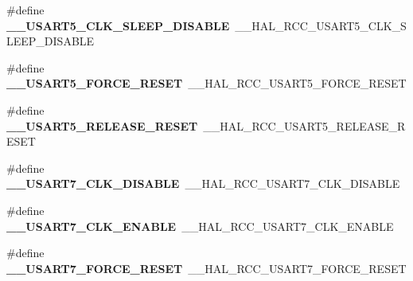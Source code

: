 \begin{DoxyCompactItemize}
\item 
\#define {\bfseries \+\_\+\+\_\+\+U\+S\+A\+R\+T5\+\_\+\+C\+L\+K\+\_\+\+S\+L\+E\+E\+P\+\_\+\+D\+I\+S\+A\+B\+LE}~\+\_\+\+\_\+\+H\+A\+L\+\_\+\+R\+C\+C\+\_\+\+U\+S\+A\+R\+T5\+\_\+\+C\+L\+K\+\_\+\+S\+L\+E\+E\+P\+\_\+\+D\+I\+S\+A\+B\+LE\hypertarget{group___h_a_l___r_c_c___aliased_ga3ebcd8aa43ec53601b15d7ddd88c7a5f}{}\label{group___h_a_l___r_c_c___aliased_ga3ebcd8aa43ec53601b15d7ddd88c7a5f}

\item 
\#define {\bfseries \+\_\+\+\_\+\+U\+S\+A\+R\+T5\+\_\+\+F\+O\+R\+C\+E\+\_\+\+R\+E\+S\+ET}~\+\_\+\+\_\+\+H\+A\+L\+\_\+\+R\+C\+C\+\_\+\+U\+S\+A\+R\+T5\+\_\+\+F\+O\+R\+C\+E\+\_\+\+R\+E\+S\+ET\hypertarget{group___h_a_l___r_c_c___aliased_gaebc2c005ab8b9526cc9d9aa8d2fbc99d}{}\label{group___h_a_l___r_c_c___aliased_gaebc2c005ab8b9526cc9d9aa8d2fbc99d}

\item 
\#define {\bfseries \+\_\+\+\_\+\+U\+S\+A\+R\+T5\+\_\+\+R\+E\+L\+E\+A\+S\+E\+\_\+\+R\+E\+S\+ET}~\+\_\+\+\_\+\+H\+A\+L\+\_\+\+R\+C\+C\+\_\+\+U\+S\+A\+R\+T5\+\_\+\+R\+E\+L\+E\+A\+S\+E\+\_\+\+R\+E\+S\+ET\hypertarget{group___h_a_l___r_c_c___aliased_gaef0270121b0ce4da2cf3f994458326ef}{}\label{group___h_a_l___r_c_c___aliased_gaef0270121b0ce4da2cf3f994458326ef}

\item 
\#define {\bfseries \+\_\+\+\_\+\+U\+S\+A\+R\+T7\+\_\+\+C\+L\+K\+\_\+\+D\+I\+S\+A\+B\+LE}~\+\_\+\+\_\+\+H\+A\+L\+\_\+\+R\+C\+C\+\_\+\+U\+S\+A\+R\+T7\+\_\+\+C\+L\+K\+\_\+\+D\+I\+S\+A\+B\+LE\hypertarget{group___h_a_l___r_c_c___aliased_gaaf4f90ed2401b149fbda79ca0d8bc141}{}\label{group___h_a_l___r_c_c___aliased_gaaf4f90ed2401b149fbda79ca0d8bc141}

\item 
\#define {\bfseries \+\_\+\+\_\+\+U\+S\+A\+R\+T7\+\_\+\+C\+L\+K\+\_\+\+E\+N\+A\+B\+LE}~\+\_\+\+\_\+\+H\+A\+L\+\_\+\+R\+C\+C\+\_\+\+U\+S\+A\+R\+T7\+\_\+\+C\+L\+K\+\_\+\+E\+N\+A\+B\+LE\hypertarget{group___h_a_l___r_c_c___aliased_ga9686a6b050f6e8e97cbea3e270cb70a4}{}\label{group___h_a_l___r_c_c___aliased_ga9686a6b050f6e8e97cbea3e270cb70a4}

\item 
\#define {\bfseries \+\_\+\+\_\+\+U\+S\+A\+R\+T7\+\_\+\+F\+O\+R\+C\+E\+\_\+\+R\+E\+S\+ET}~\+\_\+\+\_\+\+H\+A\+L\+\_\+\+R\+C\+C\+\_\+\+U\+S\+A\+R\+T7\+\_\+\+F\+O\+R\+C\+E\+\_\+\+R\+E\+S\+ET\hypertarget{group___h_a_l___r_c_c___aliased_ga06c91b1d0f80f1d44dd7718aa8145eec}{}\label{group___h_a_l___r_c_c___aliased_ga06c91b1d0f80f1d44dd7718aa8145eec}


\end{DoxyCompactItemize}
